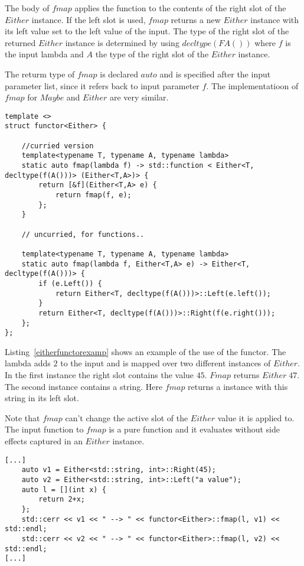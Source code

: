 \documentclass[12pt,fleqn]{article}
\begin{document}
The body of $fmap$ applies the function to the contents of the right slot of the $Either$ instance.
If the left slot is used, $fmap$ returns a new $Either$ instance with its left value set to the left value of the input.
The type of the right slot of the returned $Either$ instance is determined by using $decltype(FA())$ where $f$ is the input 
lambda and $A$ the type of the right slot of the $Either$ instance.

The returm type of $fmap$ is declared $auto$ and is specified after the input parameter list, since it refers back to input parameter $f$.
The implementatioon of $fmap$ for $Maybe$ and $Either$ are very similar.

%
%
\begin{minipage}{\linewidth}
\begin{lstlisting}[caption=Either Functor,label=eitherfunctor]
template <>
struct functor<Either> {

	//curried version
	template<typename T, typename A, typename lambda>
	static auto fmap(lambda f) -> std::function < Either<T, decltype(f(A()))> (Either<T,A>)> {
		return [&f](Either<T,A> e) {
			return fmap(f, e);
		};
	}
	
	// uncurried, for functions..
	
	template<typename T, typename A, typename lambda>
	static auto fmap(lambda f, Either<T,A> e) -> Either<T, decltype(f(A()))> {
		if (e.Left()) {
			return Either<T, decltype(f(A()))>::Left(e.left());
		} 
		return Either<T, decltype(f(A()))>::Right(f(e.right()));
	};
};
\end{lstlisting}
\end{minipage}
%
%
%

Listing~\ref{eitherfunctorexamp} shows an example of the use of the functor.
The lambda adds $2$ to the input and is mapped over two different instances of $Either$.
In the first instance the right slot contains the value $45$.
$Fmap$ returns $Either \; 47$.
The second instance contains a string.
Here $fmap$ returns a instance with this string in its left slot.

Note that $fmap$ can't change the active slot of the $Either$ value it is applied to.
The input function to $fmap$ is a pure function and it evaluates without side effects captured in an $Either$ instance. 

%
%
\begin{minipage}{\linewidth}
\begin{lstlisting}[caption=Example of the Either functor,label=eitherfunctorexamp]
[...]
	auto v1 = Either<std::string, int>::Right(45);
	auto v2 = Either<std::string, int>::Left("a value");
	auto l = [](int x) {
		return 2+x;
	};
	std::cerr << v1 << " --> " << functor<Either>::fmap(l, v1) << std::endl;
	std::cerr << v2 << " --> " << functor<Either>::fmap(l, v2) << std::endl;
[...]
\end{lstlisting}
\end{minipage}
%
%
%
\end{document}
